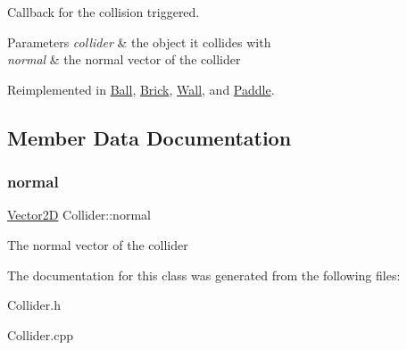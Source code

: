 Callback for the collision triggered. 


\begin{DoxyParams}{Parameters}
{\em collider} & the object it collides with \\
\hline
{\em normal} & the normal vector of the collider \\
\hline
\end{DoxyParams}


Reimplemented in \mbox{\hyperlink{class_ball_a3b386c2b504c84e82554a6f502643a2b}{Ball}}, \mbox{\hyperlink{class_brick_a37283bddbec3378192f5e8782e6f51a7}{Brick}}, \mbox{\hyperlink{class_wall_a04305c2b9f5030c2fb7270897a5f77a4}{Wall}}, and \mbox{\hyperlink{class_paddle_a90bc62843d04bcd291ab799d323002cf}{Paddle}}.



\subsection{Member Data Documentation}
\mbox{\label{class_collider_a9326e2676880c40f35832ed2c6d6b073}} 
\subsubsection{\texorpdfstring{normal}{normal}}
{\footnotesize\ttfamily \mbox{\hyperlink{struct_vector2_d}{Vector2D}} Collider\+::normal\hspace{0.3cm}{\ttfamily [private]}}

The normal vector of the collider 

The documentation for this class was generated from the following files\+:\begin{DoxyCompactItemize}
\item 
Collider.\+h\item 
Collider.\+cpp\end{DoxyCompactItemize}

